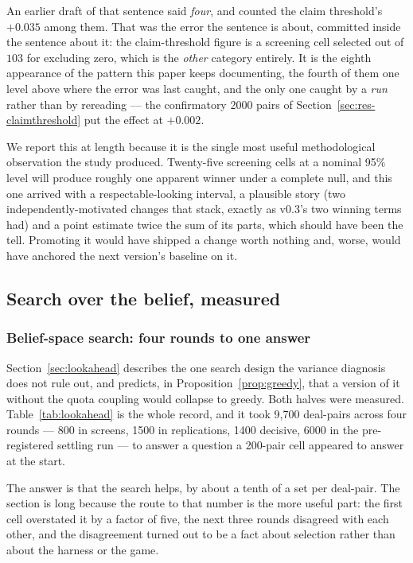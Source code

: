 \documentclass[11pt,letterpaper]{article}
\begin{document}
An earlier draft of that sentence said \emph{four}, and counted the claim
threshold's $+0.035$ among them. That was the error the sentence is about,
committed inside the sentence about it: the claim-threshold figure is a
screening cell selected out of $103$ for excluding zero, which is the
\emph{other} category entirely. It is the eighth appearance of the pattern
this paper keeps documenting, the fourth of them one level above where the
error was last caught, and the only one caught by a \emph{run} rather than by
rereading --- the confirmatory 2000 pairs of
Section~\ref{sec:res-claimthreshold} put the effect at $+0.002$.

We report this at length because it is the single most useful methodological
observation the study produced. Twenty-five screening cells at a nominal 95\%
level will produce roughly one apparent winner under a complete null, and this
one arrived with a respectable-looking interval, a plausible story (two
independently-motivated changes that stack, exactly as v0.3's two winning terms
had) and a point estimate twice the sum of its parts, which should have been
the tell. Promoting it would have shipped a change worth nothing and, worse,
would have anchored the next version's baseline on it.

\subsection{Search over the belief, measured}
\label{sec:searchres}

\subsubsection{Belief-space search: four rounds to one answer}
\label{sec:res-lookahead}

Section~\ref{sec:lookahead} describes the one search design the variance
diagnosis does not rule out, and predicts, in Proposition~\ref{prop:greedy},
that a version of it without the quota coupling would collapse to greedy. Both
halves were measured. Table~\ref{tab:lookahead} is the whole record, and it took
9{,}700 deal-pairs across four rounds --- 800 in screens, 1500 in replications,
1400 decisive, 6000 in the pre-registered settling run --- to answer a question
a 200-pair cell appeared to answer at the start.

The answer is that the search helps, by about a tenth of a set per deal-pair.
The section is long because the route to that number is the more useful part:
the first cell overstated it by a factor of five, the next three rounds
disagreed with each other, and the disagreement turned out to be a fact about
selection rather than about the harness or the game.
\end{document}
